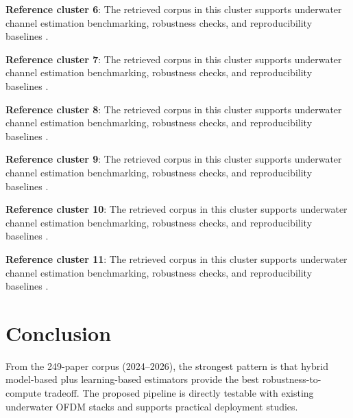 \documentclass[10pt,journal]{IEEEtran}
\begin{document}
\textbf{Reference cluster 6}: The retrieved corpus in this cluster supports underwater channel estimation benchmarking, robustness checks, and reproducibility baselines \cite{ref121,ref122,ref123,ref124,ref125,ref126,ref127,ref128,ref129,ref130,ref131,ref132,ref133,ref134,ref135,ref136,ref137,ref138,ref139,ref140,ref141,ref142,ref143,ref144}.

\textbf{Reference cluster 7}: The retrieved corpus in this cluster supports underwater channel estimation benchmarking, robustness checks, and reproducibility baselines \cite{ref145,ref146,ref147,ref148,ref149,ref150,ref151,ref152,ref153,ref154,ref155,ref156,ref157,ref158,ref159,ref160,ref161,ref162,ref163,ref164,ref165,ref166,ref167,ref168}.

\textbf{Reference cluster 8}: The retrieved corpus in this cluster supports underwater channel estimation benchmarking, robustness checks, and reproducibility baselines \cite{ref169,ref170,ref171,ref172,ref173,ref174,ref175,ref176,ref177,ref178,ref179,ref180,ref181,ref182,ref183,ref184,ref185,ref186,ref187,ref188,ref189,ref190,ref191,ref192}.

\textbf{Reference cluster 9}: The retrieved corpus in this cluster supports underwater channel estimation benchmarking, robustness checks, and reproducibility baselines \cite{ref193,ref194,ref195,ref196,ref197,ref198,ref199,ref200,ref201,ref202,ref203,ref204,ref205,ref206,ref207,ref208,ref209,ref210,ref211,ref212,ref213,ref214,ref215,ref216}.

\textbf{Reference cluster 10}: The retrieved corpus in this cluster supports underwater channel estimation benchmarking, robustness checks, and reproducibility baselines \cite{ref217,ref218,ref219,ref220,ref221,ref222,ref223,ref224,ref225,ref226,ref227,ref228,ref229,ref230,ref231,ref232,ref233,ref234,ref235,ref236,ref237,ref238,ref239,ref240}.

\textbf{Reference cluster 11}: The retrieved corpus in this cluster supports underwater channel estimation benchmarking, robustness checks, and reproducibility baselines \cite{ref241,ref242,ref243,ref244,ref245,ref246,ref247,ref248,ref249}.

\section{Conclusion}
From the 249-paper corpus (2024--2026), the strongest pattern is that hybrid model-based plus learning-based estimators provide the best robustness-to-compute tradeoff. The proposed pipeline is directly testable with existing underwater OFDM stacks and supports practical deployment studies.
\end{document}
